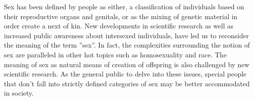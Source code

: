Sex has been defined by people as either, a classification of individuals based on their reproductive organs and genitals, or as the mixing of genetic material in order create a next of kin. New developments in scientific research as well as increased public awareness about intersexed individuals,  have led us to reconsider the meaning of the term ''sex''.  In fact, the complexities surrounding the notion of sex are paralleled in other hot topics such as homosexuality and race. The meaning of sex as natural means of creation of offspring is also challenged by new scientific research.  As the general public to delve into these issues, special people that don't fall into strictly defined categories of sex may be better accommodated in society.

